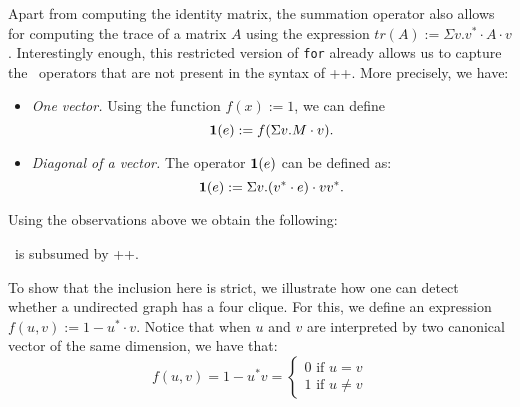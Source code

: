 Apart from computing the identity matrix, the summation operator also allows for computing the trace of a matrix $A$ using the expression $tr(A) := \Sigma v. v^*\cdot A \cdot v$. Interestingly enough, this restricted version of \texttt{for} already allows us to capture the \lang\ operators that are not present in the syntax of \lang++. More precisely, we have:
\begin{itemize}
\item {\em One vector.} Using the function $f(x) := 1$, we can define $$\mathbf{1}(e) := f(\Sigma v. M\cdot v).$$
\item {\em Diagonal of a vector.} The operator $\mathbf{1}(e)$ can be defined as:
$$\mathbf{1}(e) := \Sigma v. (v^*\cdot e) \cdot vv^*.$$
\end{itemize}

Using the observations above we obtain the following:
\begin{corollary}
\lang\ is subsumed by \lang++.
\end{corollary}

To show that the inclusion here is strict, we illustrate how one can detect whether a undirected graph has a four clique. For this, we define an expression $f(u,v) := 1 - u^*\cdot v$. Notice that when $u$ and $v$ are interpreted by two canonical vector of the same dimension, we have that:
\[
  			f(u,v)=1-u^*v=\begin{cases}
               0 \text{ if } u=v \\
               1 \text{ if } u\neq v
            \end{cases}
		\]

